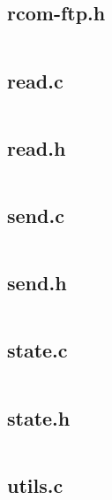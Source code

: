 \documentclass[11pt]{article}
\begin{document}
\inputminted{c}{rcom-ftp.c}

\newpage

\subsection*{rcom-ftp.h}

\inputminted{c}{rcom-ftp.h}

\newpage

\subsection*{read.c}

\inputminted{c}{read.c}

\newpage

\subsection*{read.h}

\inputminted{c}{read.h}

\newpage

\subsection*{send.c}

\inputminted{c}{send.c}

\newpage

\subsection*{send.h}

\inputminted{c}{send.h}

\newpage

\subsection*{state.c}

\inputminted{c}{state.c}

\newpage

\subsection*{state.h}

\inputminted{c}{state.h}

\newpage

\subsection*{utils.c}
\end{document}
